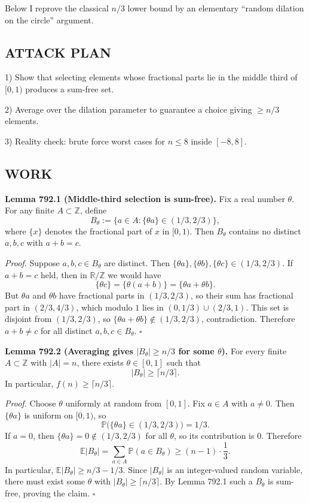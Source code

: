 Below I reprove the classical $n/3$ lower bound by an elementary ``random dilation on the circle'' argument.

\subsection*{ATTACK PLAN}
1) Show that selecting elements whose fractional parts lie in the middle third of $[0,1)$ produces a sum-free set.

2) Average over the dilation parameter to guarantee a choice giving $\ge n/3$ elements.

3) Reality check: brute force worst cases for $n\le 8$ inside $[-8,8]$.

\subsection*{WORK}
\textbf{Lemma 792.1 (Middle-third selection is sum-free).}
Fix a real number $\theta$. For any finite $A\subset\mathbb Z$, define
\[
B_\theta := \{a\in A: \{\theta a\}\in (1/3,2/3)\},
\]
where $\{x\}$ denotes the fractional part of $x$ in $[0,1)$.
Then $B_\theta$ contains no distinct $a,b,c$ with $a+b=c$.

\emph{Proof.}
Suppose $a,b,c\in B_\theta$ are distinct. Then
$\{\theta a\},\{\theta b\},\{\theta c\}\in (1/3,2/3)$.
If $a+b=c$ held, then in $\mathbb R/\mathbb Z$ we would have
\[
\{\theta c\} = \{\theta(a+b)\} = \{\theta a + \theta b\}.
\]
But $\theta a$ and $\theta b$ have fractional parts in $(1/3,2/3)$, so their sum has fractional part in
$(2/3,4/3)$, which modulo $1$ lies in $(0,1/3)\cup(2/3,1)$.
This set is disjoint from $(1/3,2/3)$, so $\{\theta a+\theta b\}\notin (1/3,2/3)$, contradiction.
Therefore $a+b\ne c$ for all distinct $a,b,c\in B_\theta$.
\hfill$\square$

\medskip
\textbf{Lemma 792.2 (Averaging gives $|B_\theta|\ge n/3$ for some $\theta$).}
For every finite $A\subset\mathbb Z$ with $|A|=n$, there exists $\theta\in[0,1]$ such that
\[|B_\theta|\ge \lceil n/3\rceil.
\]
In particular, $f(n)\ge \lceil n/3\rceil$.

\emph{Proof.}
Choose $\theta$ uniformly at random from $[0,1]$.
Fix $a\in A$ with $a\ne 0$. Then $\{\theta a\}$ is uniform on $[0,1)$, so
\[\mathbb P\bigl(\{\theta a\}\in (1/3,2/3)\bigr)=1/3.
\]
If $a=0$, then $\{\theta a\}=0\notin(1/3,2/3)$ for all $\theta$, so its contribution is $0$.
Therefore
\[
\mathbb E|B_\theta| = \sum_{a\in A} \mathbb P(a\in B_\theta) \ge (n-1)\cdot\frac13.
\]
In particular, $\mathbb E|B_\theta|\ge n/3 - 1/3$.
Since $|B_\theta|$ is an integer-valued random variable, there must exist some $\theta$ with
$|B_\theta|\ge \lceil n/3\rceil$.
By Lemma 792.1 such a $B_\theta$ is sum-free, proving the claim.
\hfill$\square$

